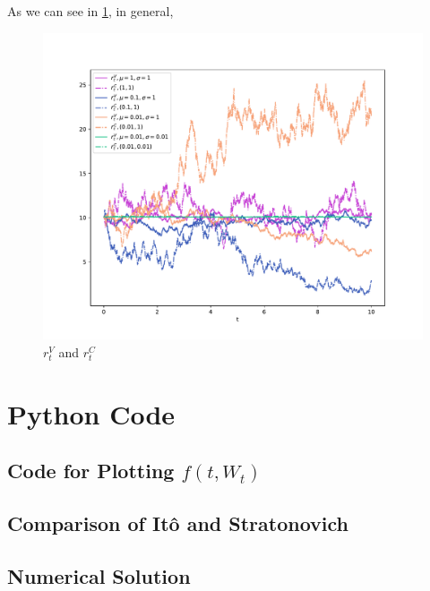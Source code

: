 \problem
As we can see in \cref{fig:num}, in general,

\begin{figure}[h]
    \centering
    \includegraphics[width=\textwidth]{num}
    \caption{$r_t^V$ and $r_t^C$}
    \label{fig:num}
\end{figure}

\appendix
\section{Python Code}
\subsection{Code for Plotting $f(t,W_t)$}

\subsection{Comparison of It\^o and Stratonovich}

\subsection{Numerical Solution}
